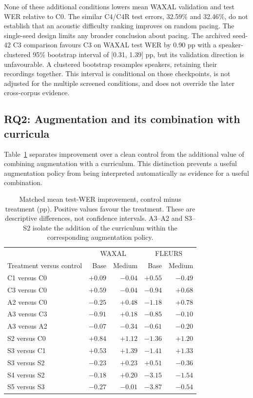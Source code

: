 \documentclass[12pt,a4paper]{report}
\begin{document}
None of these additional conditions lowers mean WAXAL validation and test
WER relative to C0. The similar C4/C4R test errors, 32.59\% and 32.46\%,
do not establish that an acoustic difficulty ranking improves on random
pacing. The single-seed design limits any broader conclusion about pacing.
The archived seed-42 C3 comparison favours C3 on WAXAL test WER by 0.90 pp
with a speaker-clustered 95\% bootstrap interval of [0.31, 1.39] pp, but
its validation direction is unfavourable. A clustered bootstrap resamples
speakers, retaining their recordings together. This interval is conditional
on those checkpoints, is not adjusted for the multiple screened conditions,
and does not override the later cross-corpus evidence.

\subsection{RQ2: Augmentation and its combination with curricula}

Table~\ref{tab:effects} separates improvement over a clean control from the
additional value of combining augmentation with a curriculum. This distinction
prevents a useful augmentation policy from being interpreted automatically
as evidence for a useful combination.

\begin{table}[htbp]\centering\small
\caption{Matched mean test-WER improvement, control minus treatment (pp).
Positive values favour the treatment. These are descriptive differences,
not confidence intervals. A3--A2 and S3--S2 isolate the addition of the
curriculum within the corresponding augmentation policy.}
\label{tab:effects}
\begin{tabular}{lrrrr}\toprule
 & \multicolumn{2}{c}{WAXAL} & \multicolumn{2}{c}{FLEURS}\\
Treatment versus control & Base & Medium & Base & Medium\\\midrule
C1 versus C0 & $+0.09$ & $-0.04$ & $+0.55$ & $-0.49$ \\
C3 versus C0 & $+0.59$ & $-0.04$ & $-0.94$ & $+0.68$ \\
A2 versus C0 & $-0.25$ & $+0.48$ & $-1.18$ & $+0.78$ \\
A3 versus C3 & $-0.91$ & $+0.18$ & $-0.85$ & $-0.10$ \\
A3 versus A2 & $-0.07$ & $-0.34$ & $-0.61$ & $-0.20$ \\
S2 versus C0 & $+0.84$ & $+1.12$ & $-1.36$ & $+1.20$ \\
S3 versus C1 & $+0.53$ & $+1.39$ & $-1.41$ & $+1.33$ \\
S3 versus S2 & $-0.23$ & $+0.23$ & $+0.51$ & $-0.36$ \\
S4 versus S2 & $-0.18$ & $+0.20$ & $-3.15$ & $-1.54$ \\
S5 versus S3 & $-0.27$ & $-0.01$ & $-3.87$ & $-0.54$ \\
\bottomrule\end{tabular}\end{table}
\end{document}
